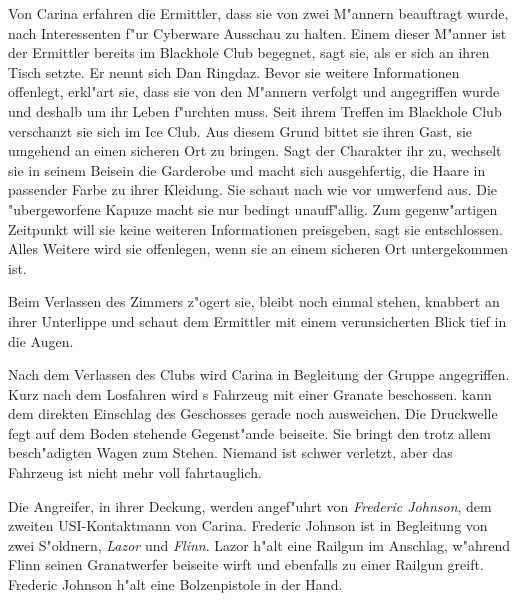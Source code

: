 Von Carina erfahren die Ermittler, dass sie von zwei M"annern beauftragt wurde, nach Interessenten f"ur Cyberware Ausschau zu halten. Einem dieser M"anner ist der Ermittler bereits im Blackhole Club begegnet, sagt sie, als er sich an ihren Tisch setzte. Er nennt sich Dan Ringdaz. Bevor sie weitere Informationen offenlegt, erkl"art sie, dass sie von den M"annern verfolgt und angegriffen wurde und deshalb um ihr Leben f"urchten muss. Seit ihrem Treffen im Blackhole Club verschanzt sie sich im Ice Club. Aus diesem Grund bittet sie ihren Gast, sie umgehend an einen sicheren Ort zu bringen. Sagt der Charakter ihr zu, wechselt sie in seinem Beisein die Garderobe und macht sich ausgehfertig, die Haare in passender Farbe zu ihrer Kleidung. Sie schaut nach wie vor umwerfend aus. Die "ubergeworfene Kapuze macht sie nur bedingt unauff"allig. Zum gegenw"artigen Zeitpunkt will sie keine weiteren Informationen preisgeben, sagt sie entschlossen. Alles Weitere wird sie offenlegen, wenn sie an einem sicheren Ort untergekommen ist.

Beim Verlassen des Zimmers z"ogert sie, bleibt noch einmal stehen, knabbert an ihrer Unterlippe und schaut dem Ermittler mit einem verunsicherten Blick tief in die Augen.


Nach dem Verlassen des Clubs wird Carina in Begleitung der Gruppe angegriffen. Kurz nach dem Losfahren wird \xl{}s Fahrzeug mit einer Granate beschossen. \xl{} kann dem direkten Einschlag des Geschosses gerade noch ausweichen. Die Druckwelle fegt auf dem Boden stehende Gegenst"ande beiseite. Sie bringt den trotz allem besch"adigten Wagen zum Stehen. Niemand ist schwer verletzt, aber das Fahrzeug ist nicht mehr voll fahrtauglich. 

Die Angreifer, in ihrer Deckung, werden angef"uhrt von \emph{Frederic Johnson}, dem zweiten USI-Kontaktmann von Carina. Frederic Johnson ist in Begleitung von zwei S"oldnern, \emph{Lazor} und \emph{Flinn}. Lazor h"alt eine Railgun im Anschlag, w"ahrend Flinn seinen Granatwerfer beiseite wirft und ebenfalls zu einer Railgun greift. Frederic Johnson h"alt eine Bolzenpistole in der Hand. 

